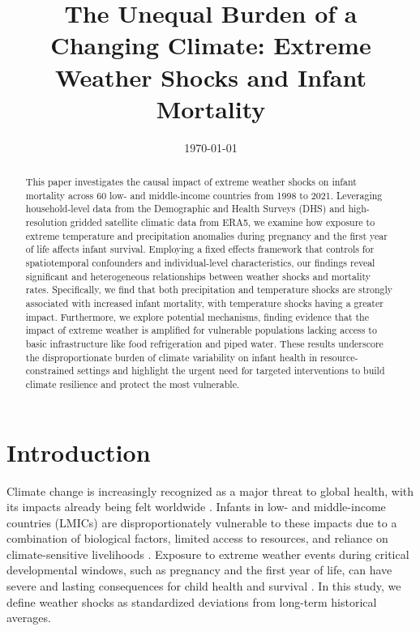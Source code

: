 \documentclass[a4paper]{article}
\title{The Unequal Burden of a Changing Climate: Extreme Weather Shocks and Infant Mortality}
\author{}
\date{\today}
\begin{document}
\maketitle

\begin{abstract}
This paper investigates the causal impact of extreme weather shocks on infant mortality across 60 low- and middle-income countries from 1998 to 2021. Leveraging household-level data from the Demographic and Health Surveys (DHS) and high-resolution gridded satellite climatic data from ERA5, we examine how exposure to extreme temperature and precipitation anomalies during pregnancy and the first year of life affects infant survival.  Employing a fixed effects framework that controls for spatiotemporal confounders and individual-level characteristics, our findings reveal significant and heterogeneous relationships between weather shocks and mortality rates. Specifically, we find that both precipitation and temperature shocks are strongly associated with increased infant mortality, with temperature shocks having a greater impact. Furthermore, we explore potential mechanisms, finding evidence that the impact of extreme weather is amplified for vulnerable populations lacking access to basic infrastructure like food refrigeration and piped water.  These results underscore the disproportionate burden of climate variability on infant health in resource-constrained settings and highlight the urgent need for targeted interventions to build climate resilience and protect the most vulnerable.
\end{abstract}

\newpage

\section{Introduction}

Climate change is increasingly recognized as a major threat to global health, with its impacts already being felt worldwide \cite{watts2018lancet}.  Infants in low- and middle-income countries (LMICs) are disproportionately vulnerable to these impacts due to a combination of biological factors, limited access to resources, and reliance on climate-sensitive livelihoods \cite{UNICEF2015}. Exposure to extreme weather events during critical developmental windows, such as pregnancy and the first year of life, can have severe and lasting consequences for child health and survival \cite{adger2006fair}.  In this study, we define weather shocks as standardized deviations from long-term historical averages.
\end{document}
